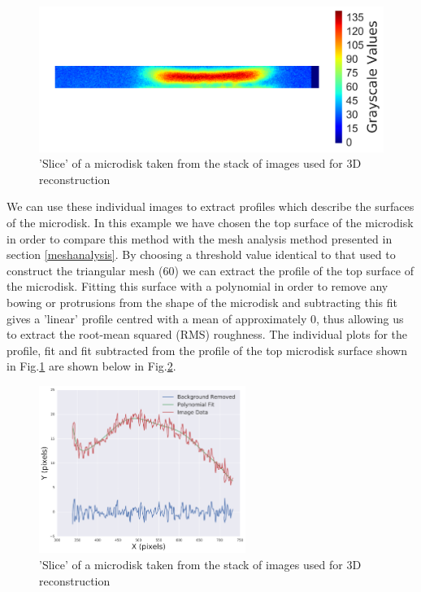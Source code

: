 \begin{figure}[h]
	\centering
	\includegraphics[width=1\textwidth]{Figs/Ch4/slice591.png}
	\caption {'Slice' of a microdisk taken from the stack of images used for 3D reconstruction}
	\label{slice591}
\end{figure}
\FloatBarrier

We can use these individual images to extract profiles which describe the surfaces of the microdisk. In this example we have chosen the top surface of the microdisk in order to compare this method with the mesh analysis method presented in section \ref{meshanalysis}. By choosing a threshold value identical to that used to construct the triangular mesh (60) we can extract the profile of the top surface of the microdisk. Fitting this surface with a polynomial in order to remove any bowing or protrusions from the shape of the microdisk and subtracting this fit gives a 'linear' profile centred with a mean of approximately 0, thus allowing us to extract the root-mean squared (RMS) roughness. The individual plots for the profile, fit and fit subtracted from the profile of the top microdisk surface shown in Fig.\ref{slice591} are shown below in Fig.\ref{fitting}. 

\begin{figure}[h]
	\centering
	\includegraphics[width=0.6\textwidth]{Figs/Ch4/RMS_back_removal.png}
	\caption {'Slice' of a microdisk taken from the stack of images used for 3D reconstruction}
	\label{fitting}
\end{figure}
\FloatBarrier

